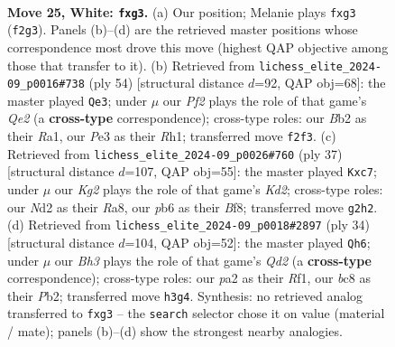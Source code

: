 \documentclass[11pt]{article}
\begin{document}
\clearpage

\begin{figure}[p]\centering
\begin{subfigure}{0.46\textwidth}\centering
\resizebox{\linewidth}{!}{%
\newchessgame
\chessboard[
  setfen={rqb1k2r/p3b1pp/1p6/n2p1p2/P2P3P/4P1nB/pB1N1PK1/1NQ1R3 w - - 0 25},
  showmover=false,
  pgfstyle=straightmove, color=movearrow, markmove={f2-g3}
]}
\caption{}
\end{subfigure}\hfill
\begin{subfigure}{0.46\textwidth}\centering
\resizebox{\linewidth}{!}{%
\newchessgame
\chessboard[
  setfen={rn2r1k1/1p4b1/p2p2qp/P2P2p1/2pBP3/3n2PP/1PNKQ3/R5NR w - - 4 28},
  showmover=false,
  pgfstyle=straightmove, color=movearrow, markmove={e2-e3}
]}
\caption{}
\end{subfigure}
\\[4pt]
\begin{subfigure}{0.46\textwidth}\centering
\resizebox{\linewidth}{!}{%
\newchessgame
\chessboard[
  setfen={r4bnr/qpBk2p1/2n1p3/p2p1N2/P2P3p/7P/1P2B1P1/R2QNRK1 b - - 0 19},
  showmover=false,
  pgfstyle=straightmove, color=movearrow, markmove={d7-c7}
]}
\caption{}
\end{subfigure}\hfill
\begin{subfigure}{0.46\textwidth}\centering
\resizebox{\linewidth}{!}{%
\newchessgame
\chessboard[
  setfen={r4rk1/pp3N2/1qp1b1p1/2n1p2p/2B1P2P/2N5/PPPQ2P1/2K2R1n w - - 1 18},
  showmover=false,
  pgfstyle=straightmove, color=movearrow, markmove={d2-h6}
]}
\caption{}
\end{subfigure}
\caption{\textbf{Move 25, White: \texttt{fxg3}.} (a) Our position; Melanie plays \texttt{fxg3} (\texttt{f2g3}). Panels (b)--(d) are the retrieved master positions whose correspondence most drove this move (highest QAP objective among those that transfer to it). (b) Retrieved from \texttt{lichess\_elite\_2024-09\_p0016\#738} (ply 54) [structural distance $d$=92, QAP obj=68]: the master played \texttt{Qe3}; under $\mu$ our \emph{Pf2} plays the role of that game's \emph{Qe2} (a \textbf{cross-type} correspondence); cross-type roles: our \emph{B}b2 as their \emph{R}a1, our \emph{P}e3 as their \emph{R}h1; transferred move \texttt{f2f3}. (c) Retrieved from \texttt{lichess\_elite\_2024-09\_p0026\#760} (ply 37) [structural distance $d$=107, QAP obj=55]: the master played \texttt{Kxc7}; under $\mu$ our \emph{Kg2} plays the role of that game's \emph{Kd2}; cross-type roles: our \emph{N}d2 as their \emph{R}a8, our \emph{p}b6 as their \emph{B}f8; transferred move \texttt{g2h2}. (d) Retrieved from \texttt{lichess\_elite\_2024-09\_p0018\#2897} (ply 34) [structural distance $d$=104, QAP obj=52]: the master played \texttt{Qh6}; under $\mu$ our \emph{Bh3} plays the role of that game's \emph{Qd2} (a \textbf{cross-type} correspondence); cross-type roles: our \emph{p}a2 as their \emph{R}f1, our \emph{b}c8 as their \emph{P}b2; transferred move \texttt{h3g4}. Synthesis: no retrieved analog transferred to \texttt{fxg3} -- the \texttt{search} selector chose it on value (material / mate); panels (b)--(d) show the strongest nearby analogies.}
\label{fig:thought-m48}
\end{figure}
\end{document}
